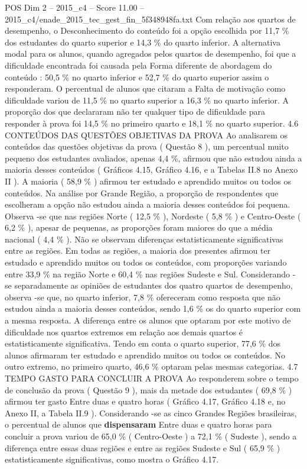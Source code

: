\begin{textsample}{POS Dim 2 – 2015\_c4 – Score 11.00 – 2015\_c4/enade\_2015\_tec\_gest\_fin\_5f348948fa.txt}
Com relação aos quartos de desempenho, o Desconhecimento do conteúdo foi a opção escolhida por 11,7 \% dos estudantes do quarto superior e 14,3 \% do quarto inferior.
A alternativa modal para os alunos, quando agregados pelos quartos de desempenho, foi que a dificuldade encontrada foi causada pela Forma diferente de abordagem do conteúdo : 50,5 \% no quarto inferior e 52,7 \% do quarto superior assim o responderam.
O percentual de alunos que citaram a Falta de motivação como dificuldade variou de 11,5 \% no quarto superior a 16,3 \% no quarto inferior.
A proporção dos que declararam não ter qualquer tipo de dificuldade para responder à prova foi 14,5 \% no primeiro quarto e 18,1 \% no quarto superior. 4.6 CONTEÚDOS DAS QUESTÕES OBJETIVAS DA PROVA Ao analisarem os conteúdos das questões objetivas da prova ( Questão 8 ), um percentual muito pequeno dos estudantes avaliados, apenas 4,4 \%, afirmou que não estudou ainda a maioria desses conteúdos ( Gráficos 4.15, Gráfico 4.16, e a Tabelas II.8 no Anexo II ).
A maioria ( 58,9 \% ) afirmou ter estudado e aprendido muitos ou todos os conteúdos.
Na análise por Grande Região, a proporção de respondentes que escolheram a opção não estudou ainda a maioria desses conteúdos foi pequena.
Observa -se que nas regiões Norte ( 12,5 \% ), Nordeste ( 5,8 \% ) e Centro-Oeste ( 6,2 \% ), apesar de pequenas, as proporções foram maiores do que a média nacional ( 4,4 \% ).
Não se observam diferenças estatisticamente significativas entre as regiões.
Em todas as regiões, a maioria dos presentes afirmou ter estudado e aprendido muitos ou todos os conteúdos, com proporções variando entre 33,9 \% na região Norte e 60,4 \% nas regiões Sudeste e Sul.
Considerando -se separadamente as opiniões de estudantes dos quatro quartos de desempenho, observa -se que, no quarto inferior, 7,8 \% ofereceram como resposta que não estudou ainda a maioria desses conteúdos, sendo 1,6 \% os do quarto superior com a mesma resposta.
A diferença entre os alunos que optaram por este motivo de dificuldade nos quartos extremos em relação aos demais quartos é estatisticamente significativa.
Tendo em conta o quarto superior, 77,6 \% dos alunos afirmaram ter estudado e aprendido muitos ou todos os conteúdos.
No outro extremo, no primeiro quarto, 46,6 \% optaram pelas mesmas categorias. 4.7 TEMPO GASTO PARA CONCLUIR A PROVA Ao responderem sobre o tempo de conclusão da prova ( Questão 9 ), mais da metade dos estudantes ( 69,8 \% ) afirmou ter gasto Entre duas e quatro horas ( Gráfico 4.17, Gráfico 4.18 e, no Anexo II, a Tabela II.9 ).
Considerando -se as cinco Grandes Regiões brasileiras, o percentual de alunos que \textbf{dispensaram} Entre duas e quatro horas para concluir a prova variou de 65,0 \% ( Centro-Oeste ) a 72,1 \% ( Sudeste ), sendo a diferença entre essas duas regiões e entre as regiões Sudeste e Sul ( 65,9 \% ) estatisticamente significativas, como mostra o Gráfico 4.17.

\end{textsample}
